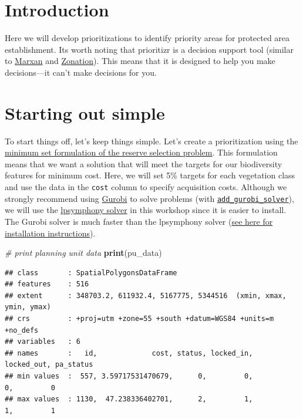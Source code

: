 \documentclass[
  12pt,
]{book}
\newenvironment{Shaded}{\begin{snugshade}}{\end{snugshade}}
\newcommand{\CommentTok}[1]{\textcolor[rgb]{0.56,0.35,0.01}{\textit{#1}}}
\newcommand{\KeywordTok}[1]{\textcolor[rgb]{0.13,0.29,0.53}{\textbf{#1}}}
\newcommand{\NormalTok}[1]{#1}
\begin{document}
\hypertarget{introduction-2}{%
\section{Introduction}\label{introduction-2}}

Here we will develop prioritizations to identify priority areas for protected area establishment. Its worth noting that prioritizr is a decision support tool (similar to \href{http://marxan.org/}{Marxan} and \href{https://www.helsinki.fi/en/researchgroups/digital-geography-lab/software-developed-in-cbig\#section-52992}{Zonation}). This means that it is designed to help you make decisions---it can't make decisions for you.

\hypertarget{starting-out-simple}{%
\section{Starting out simple}\label{starting-out-simple}}

To start things off, let's keep things simple. Let's create a prioritization using the \href{https://prioritizr.net/reference/add_min_set_objective.html}{minimum set formulation of the reserve selection problem}. This formulation means that we want a solution that will meet the targets for our biodiversity features for minimum cost. Here, we will set 5\% targets for each vegetation class and use the data in the \texttt{cost} column to specify acquisition costs. Although we strongly recommend using \href{https://www.gurobi.com/}{Gurobi} to solve problems (with \href{https://prioritizr.net/reference/add_gurobi_solver.html}{\texttt{add\_gurobi\_solver}}), we will use the \href{https://prioritizr.net/reference/add_lpsymphony_solver.html}{lpsymphony solver} in this workshop since it is easier to install. The Gurobi solver is much faster than the lpsymphony solver (\href{https://prioritizr.net/articles/gurobi_installation.html}{see here for installation instructions}).

\begin{Shaded}
\begin{Highlighting}[]
\CommentTok{# print planning unit data}
\KeywordTok{print}\NormalTok{(pu_data)}
\end{Highlighting}
\end{Shaded}

\begin{verbatim}
## class       : SpatialPolygonsDataFrame 
## features    : 516 
## extent      : 348703.2, 611932.4, 5167775, 5344516  (xmin, xmax, ymin, ymax)
## crs         : +proj=utm +zone=55 +south +datum=WGS84 +units=m +no_defs 
## variables   : 6
## names       :   id,             cost, status, locked_in, locked_out, pa_status 
## min values  :  557, 3.59717531470679,      0,         0,          0,         0 
## max values  : 1130,  47.238336402701,      2,         1,          1,         1
\end{verbatim}
\end{document}
